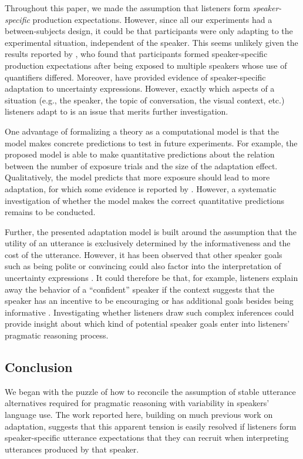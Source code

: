 Throughout this paper, we made the assumption that listeners  form \textit{speaker-specific} production expectations. However,
since all our experiments had a between-subjects design, it could be that participants were only adapting to the experimental
situation, independent of the speaker. This seems unlikely given the results reported by \cite{Yildirim2016}, who found that
participants formed speaker-specific production expectations after being exposed to multiple speakers whose use of
quantifiers differed. Moreover,  \cite{Schuster2019} have provided evidence of speaker-specific adaptation to 
uncertainty expressions. However, exactly which aspects of a situation (e.g., the speaker, the topic of conversation, the visual context, etc.)
listeners adapt to is an issue that merits further investigation.

One advantage of formalizing a theory as a computational model is that the model 
makes concrete predictions to test in future experiments. For example, the proposed
model is able to make quantitative predictions about the relation between the number of exposure
trials and the size of the adaptation effect. Qualitatively, the model predicts that more exposure
should lead to more adaptation, for which some evidence is reported by \cite{Schuster2019}.
However,  a systematic investigation of whether the model makes the correct quantitative predictions remains to be conducted. 

Further, the presented adaptation model is built around the assumption that the utility of an utterance is exclusively determined
by the informativeness and the cost of the utterance. However, it has been observed that other speaker goals such as being polite or
convincing could also factor into the interpretation of uncertainty expressions \cite[see e.g,][]{Pighin2011,Juanchich2013,Holtgraves2016}.
It could therefore be that, for example, listeners explain away the behavior of a ``confident'' speaker if the context suggests that the speaker
has an incentive to be encouraging or has additional goals besides being informative \cite[see also][]{Yoon2016,Yoon2017}. Investigating whether listeners draw such complex inferences
could provide  insight about which kind of potential speaker goals enter into listeners' pragmatic reasoning process.


\subsection{Conclusion}

We began with the puzzle of how to reconcile the assumption of stable utterance alternatives required for pragmatic reasoning with variability in speakers'  language use. The work reported here, building on much previous work on adaptation, suggests that this apparent tension is easily resolved if listeners form speaker-specific utterance expectations that they can recruit when interpreting utterances produced by that speaker.

